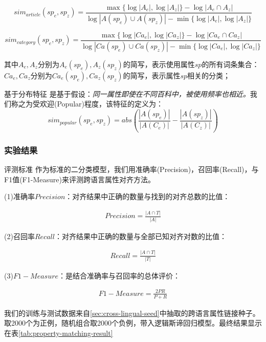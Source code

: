\begin{equation}
\label{equ:sim-article}
sim_{article}(sp_e, sp_z) = \frac{\max\{\log |A_e|, \log |A_z|\} - \log|A_e \cap A_z|}
{\log |A(sp_e) \cup A(sp_z)| - \min\{\log |A_e|, \log |A_z|\}}
\end{equation}

\begin{equation}
\label{equ:sim-category}
sim_{category}(sp_e, sp_z) = \frac{\max\{\log |Ca_e|, \log |Ca_z|\} - \log|Ca_e \cap Ca_z|}
{\log |Ca(sp_e) \cup Ca(sp_z)| - \min\{\log |Ca_e|, \log |Ca_z|\}}
\end{equation}

其中$A_e, A_z$分别为$A_e(sp_e),A_z(sp_z)$的简写，表示使用属性$sp$的所有词条集合：$Ca_e, Ca_z$分别为$Ca_e(sp_e), Ca_z(sp_z)$的简写，表示属性$sp$相关的分类；

{\heiti 基于分布特征}
是基于假设：\textit{同一属性即使在不同百科中，被使用频率也相近。}我们称之为受欢迎(Popular)程度，该特征的定义为：
\begin{equation}
sim_{popular}(sp_e, sp_z) = abs(\frac{|A(sp_e)|}{|A(C_e)|} - \frac{|A(sp_z)|}{|A(C_z)|})
\end{equation}

\subsubsection{实验结果}

{\heiti 评测标准}
作为标准的二分类模型，我们用准确率(Precision)，召回率(Recall)，与F1值(F1-Measure)来评测跨语言属性对齐方法。

(1)准确率$Precision$：对齐结果中正确的数量与找到的对齐总数的比值：

\begin{align}
Precision = \frac { \left| A\cap T \right|  }{ \left| A \right|  } 
\end{align}

(2)召回率$Recall$：对齐结果中正确的数量与全部已知对齐对数的比值：

\begin{align}
Recall = \frac { \left| A\cap T \right|  }{ \left| T \right|  } 
\end{align}

(3)$F1-Measure$：是结合准确率与召回率的总体评价：

\begin{align}
F1-Measure = \frac { 2PR }{ P+R } 
\end{align}

我们的训练与测试数据来自\ref{sec:cross-lingual-seed}中抽取的跨语言属性链接种子。取2000个为正例，随机组合取2000个负例，带入逻辑斯谛回归模型。最终结果显示在表\ref{tab:property-matching-result}

